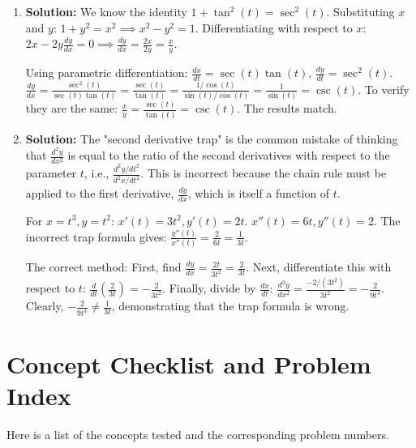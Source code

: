 \documentclass{article}
\begin{document}
\begin{enumerate}
\item \textbf{Solution:} We know the identity $1+\tan^2(t) = \sec^2(t)$.
Substituting $x$ and $y$: $1+y^2=x^2 \implies x^2 - y^2 = 1$.
Differentiating with respect to $x$: $2x - 2y\frac{dy}{dx} = 0 \implies \frac{dy}{dx} = \frac{2x}{2y} = \frac{x}{y}$.

Using parametric differentiation:
$\frac{dx}{dt} = \sec(t)\tan(t)$, $\frac{dy}{dt} = \sec^2(t)$.
$\frac{dy}{dx} = \frac{\sec^2(t)}{\sec(t)\tan(t)} = \frac{\sec(t)}{\tan(t)} = \frac{1/\cos(t)}{\sin(t)/\cos(t)} = \frac{1}{\sin(t)} = \csc(t)$.
To verify they are the same: $\frac{x}{y} = \frac{\sec(t)}{\tan(t)} = \csc(t)$. The results match.

\item \textbf{Solution:} The "second derivative trap" is the common mistake of thinking that $\frac{d^2y}{dx^2}$ is equal to the ratio of the second derivatives with respect to the parameter $t$, i.e., $\frac{d^2y/dt^2}{d^2x/dt^2}$. This is incorrect because the chain rule must be applied to the first derivative, $\frac{dy}{dx}$, which is itself a function of $t$.

For $x=t^3, y=t^2$:
$x'(t)=3t^2, y'(t)=2t$.
$x''(t)=6t, y''(t)=2$.
The incorrect trap formula gives: $\frac{y''(t)}{x''(t)} = \frac{2}{6t} = \frac{1}{3t}$.

The correct method:
First, find $\frac{dy}{dx} = \frac{2t}{3t^2} = \frac{2}{3t}$.
Next, differentiate this with respect to $t$: $\frac{d}{dt}\left(\frac{2}{3t}\right) = -\frac{2}{3t^2}$.
Finally, divide by $\frac{dx}{dt}$:
$\frac{d^2y}{dx^2} = \frac{-2/(3t^2)}{3t^2} = -\frac{2}{9t^4}$.
Clearly, $-\frac{2}{9t^4} \neq \frac{1}{3t}$, demonstrating that the trap formula is wrong.

\end{enumerate}

\newpage
\section*{Concept Checklist and Problem Index}
Here is a list of the concepts tested and the corresponding problem numbers.
\end{document}
